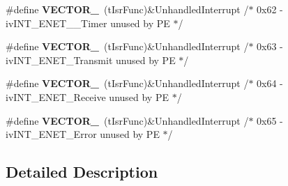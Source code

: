 \begin{DoxyCompactItemize}
\item 
\#define {\bfseries V\+E\+C\+T\+O\+R\+\_}~(t\+Isr\+Func)\&Unhandled\+Interrupt         /$\ast$ 0x62 -\/    iv\+I\+N\+T\+\_\+\+E\+N\+E\+T\+\_\+\_\+\+Timer          unused by P\+E $\ast$/\hypertarget{group___vectors___config__module_ga918a66a8cab8696c8d2081a8d318b10a}{}\label{group___vectors___config__module_ga918a66a8cab8696c8d2081a8d318b10a}

\item 
\#define {\bfseries V\+E\+C\+T\+O\+R\+\_}~(t\+Isr\+Func)\&Unhandled\+Interrupt         /$\ast$ 0x63 -\/    iv\+I\+N\+T\+\_\+\+E\+N\+E\+T\+\_\+\+Transmit            unused by P\+E $\ast$/\hypertarget{group___vectors___config__module_ga0931fc2eb1dd2ca4810d3b409d4458c9}{}\label{group___vectors___config__module_ga0931fc2eb1dd2ca4810d3b409d4458c9}

\item 
\#define {\bfseries V\+E\+C\+T\+O\+R\+\_}~(t\+Isr\+Func)\&Unhandled\+Interrupt         /$\ast$ 0x64 -\/    iv\+I\+N\+T\+\_\+\+E\+N\+E\+T\+\_\+\+Receive             unused by P\+E $\ast$/\hypertarget{group___vectors___config__module_ga773fc25c131e3257cecc2f4d6635b5c9}{}\label{group___vectors___config__module_ga773fc25c131e3257cecc2f4d6635b5c9}

\item 
\#define {\bfseries V\+E\+C\+T\+O\+R\+\_}~(t\+Isr\+Func)\&Unhandled\+Interrupt         /$\ast$ 0x65 -\/    iv\+I\+N\+T\+\_\+\+E\+N\+E\+T\+\_\+\+Error               unused by P\+E $\ast$/\hypertarget{group___vectors___config__module_gab79c328de6b18a44b6cd728947b1afb4}{}\label{group___vectors___config__module_gab79c328de6b18a44b6cd728947b1afb4}

\end{DoxyCompactItemize}


\subsection{Detailed Description}

